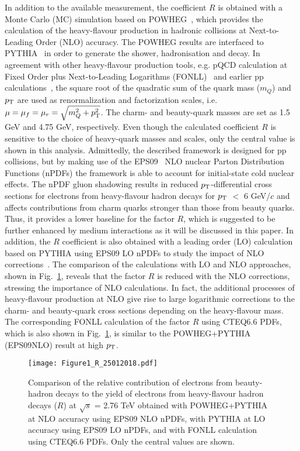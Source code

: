 \documentclass[11pt,a4paper]{article}
\providecommand{\pT}{$p_{\rm T}$ }
\providecommand{\s}{$\sqrt{s}$ }
\begin{document}
In addition to the available measurement, the coefficient $R$ is obtained with a Monte Carlo (MC) simulation based on POWHEG~\cite{POWHEG}, which provides the calculation of the heavy-flavour production in hadronic collisions at Next-to-Leading Order (NLO) accuracy. The POWHEG results are interfaced to  PYTHIA~\cite{Sjostrand:2007gs,Pythia8}  in order to generate the shower, hadronisation and decay. 
In agreement with other heavy-flavour production tools, e.g. pQCD calculation at Fixed Order plus Next-to-Leading Logarithms (FONLL)~\cite{1126-6708-1998-05-007,Cacciari2012} and earlier pp calculations~\cite{Klasen:2014dba}, the square root of the quadratic sum of the quark mass ($m_Q$) and $p_{\rm T}$  are used as renormalization and factorization scales, i.e. $\mu=\mu_f=\mu_r=\sqrt{m_Q^2+p_{\rm T}^{2}}$. The charm- and beauty-quark masses are set as 1.5 GeV and 4.75 GeV, respectively.
Even though the calculated coefficient $R$ is sensitive to the choice of heavy-quark masses and scales, only the central value is shown in this analysis.
 Admittedly, the described framework is designed for pp collisions, but by making use of the EPS09~\cite{EPS09} NLO nuclear Parton Distribution Functions (nPDFs) the framework is able to account for initial-state cold nuclear effects.
The nPDF gluon shadowing results in reduced $p_{\rm T}$-differential cross sections for electrons from heavy-flavour hadron decays for  \pT $<$ 6 GeV/$c$ and affects contributions from charm quarks stronger than those from beauty quarks. 
Thus, it provides a lower baseline for the factor $R$, which is suggested to be further enhanced by medium interactions as it will be discussed in this paper. 
In addition, the $R$ coefficient is also obtained with a leading order (LO) calculation based on PYTHIA using EPS09 LO nPDFs to study the impact of NLO corrections~\cite{Klasen:2014dba}.
The comparison of the calculations with LO and NLO approaches, shown in  Fig.~\ref{fig:POWHEG}, reveals that 
the factor $R$ is reduced with the NLO corrections, stressing the importance of NLO calculations. In fact, the additional processes of heavy-flavour production at NLO  give rise to large logarithmic corrections to the charm- and beauty-quark cross sections depending on the heavy-flavour mass. 
The corresponding FONLL calculation of the factor $R$ using CTEQ6.6 PDFs, which is also shown in Fig.~\ref{fig:POWHEG}, is similar to the POWHEG+PYTHIA   (EPS09NLO) result at high $p_{\rm T}$. 


\begin{figure}
  \centering
  \texttt{[image: Figure1\_R\_25012018.pdf]}
   \caption{Comparison of the relative contribution of electrons from beauty-hadron decays to the yield of electrons from heavy-flavour hadron decays ($R$) at \s = 2.76 TeV obtained with POWHEG+PYTHIA~\cite{POWHEG,Sjostrand:2007gs,Pythia8} at NLO accuracy using  EPS09 NLO nPDFs, with PYTHIA at LO accuracy  using EPS09 LO nPDFs, and with FONLL calculation~\cite{1126-6708-1998-05-007,Cacciari2012} using CTEQ6.6 PDFs. Only the central values are shown.}
   \label{fig:POWHEG}
\end{figure}
\end{document}
